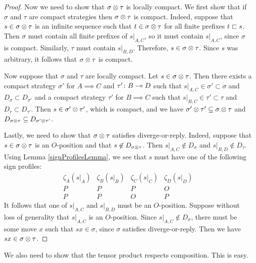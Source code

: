 \documentclass{article}
\begin{document}
\begin{proposition}
\begin{proof}
    Now we need to show that $\sigma\otimes\tau$ is locally compact.  We first show that if $\sigma$ and $\tau$ are compact strategies then $\sigma\otimes\tau$ is compact.  Indeed, suppose that $s\in\sigma\otimes\tau$ is an infinite sequence such that $t\in\sigma\otimes\tau$ for all finite prefixes $t\sqsubset s$.  Then $\sigma$ must contain all finite prefixes of $s\vert_{A,C}$, so it must contain $s\vert_{A,C}$, since $\sigma$ is compact.  Similarly, $\tau$ must contain $s\vert_{B,D}$.  Therefore, $s\in\sigma\otimes\tau$.  Since $s$ was arbitrary, it follows that $\sigma\otimes\tau$ is compact.  

    Now suppose that $\sigma$ and $\tau$ are locally compact.  Let $s\in\sigma\otimes\tau$.  Then there exists a compact strategy $\sigma'$ for $A\implies C$ and $\tau'\colon B\multimap D$ such that $s\vert_{A,C}\in\sigma'\subset\sigma$ and $D_\sigma\subset D_{\sigma'}$ and a compact strategy $\tau'$ for $B\implies C$ such that $s\vert_{B,C}\in\tau'\subset \tau$ and $D_\tau\subset D_{\tau'}$.  Then $s\in\sigma'\otimes\tau'$, which is compact, and we have $\sigma'\otimes\tau'\subseteq\sigma\otimes\tau$ and $D_{\sigma\otimes\tau}\subseteq D_{\sigma'\otimes\tau'}$.

    Lastly, we need to show that $\sigma\otimes\tau$ satisfies diverge-or-reply.  Indeed, suppose that $s\in\sigma\otimes\tau$ is an $O$-position and that $s\not\in D_{\sigma\otimes\tau}$.  Then $s\vert_{A,C}\not\in D_\sigma$ and $s\vert_{B,D}\not\in D_\tau$.  Using Lemma \ref{signProfilesLemma}, we see that $s$ must have one of the following sign profiles:
    \[
      \begin{array}{cccc}
        \zeta_A(s\vert_A) & \zeta_B(s\vert_B) & \zeta_C(s\vert_C) & \zeta_D(s\vert_D) \\
        \hline
        P & P & P & O \\
        P & P & O & P
      \end{array}
      \]
    It follows that one of $s\vert_{A,C}$ and $s\vert_{B,D}$ must be an $O$-position.  Suppose without loss of generality that $s\vert_{A,C}$ is an $O$-position.  Since $s\vert_{A,C}\not\in D_\sigma$, there must be some move $x$ such that $sx\in\sigma$, since $\sigma$ satisfies diverge-or-reply.  Then we have $sx\in\sigma\otimes\tau$.
  \end{proof}
\end{proposition}

We also need to show that the tensor product respects composition.  This is easy.
\end{document}
